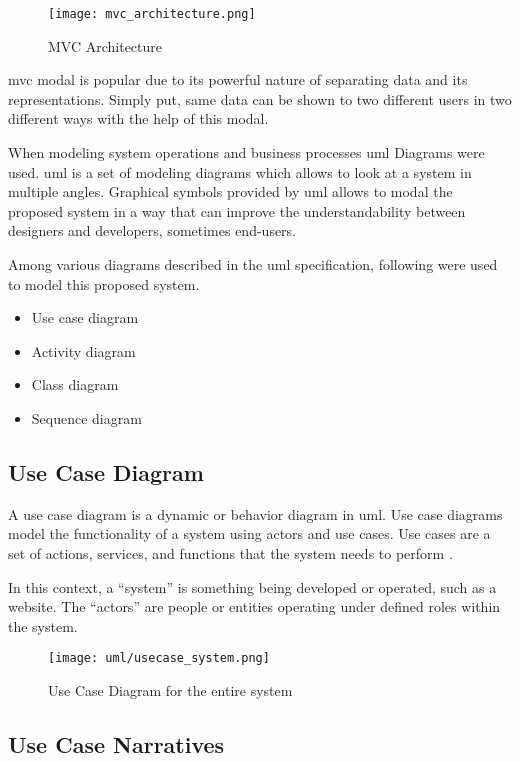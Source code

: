 \documentclass[12pt]{report}
\begin{document}
\begin{figure}[H]
	\centering
	\texttt{[image: mvc\_architecture.png]}
	\caption{MVC Architecture}
\end{figure}

\acrshort{mvc} modal is popular due to its powerful nature of separating data and its representations. Simply put, same data can be shown to two different users in two different ways with the help of this modal.

When modeling system operations and business processes \acrshort{uml} Diagrams were used. \acrshort{uml} is a set of modeling diagrams which allows to look at a system in multiple angles. Graphical symbols provided by \acrshort{uml} allows to modal the proposed system in a way that can improve the understandability between designers and developers, sometimes end-users.

Among various diagrams described in the \acrshort{uml} specification, following were used to model this proposed system.

\begin{itemize}
	\item Use case diagram
	\item Activity diagram
	\item Class diagram
	\item Sequence diagram
\end{itemize}

\newpage
\subsection{Use Case Diagram}
A use case diagram is a dynamic or behavior diagram in \acrshort{uml}. Use case diagrams model the functionality of a system using actors and use cases. Use cases are a set of actions, services, and functions that the system needs to perform \cite{paradigm_2018_uml}.

In this context, a ``system'' is something being developed or operated, such as a website. The ``actors'' are people or entities operating under defined roles within the system.

\begin{figure}[H]
	\centering
	\texttt{[image: uml/usecase\_system.png]}
	\caption{Use Case Diagram for the entire system}
\end{figure}

\newpage
\subsection{Use Case Narratives}
\end{document}
